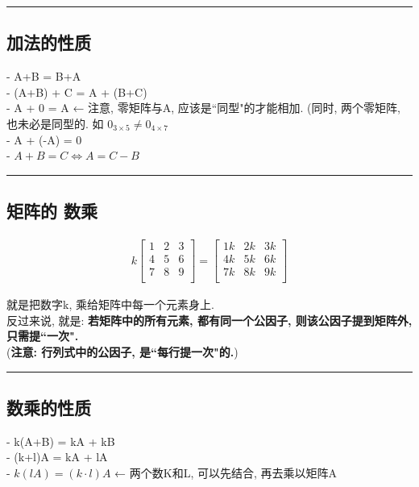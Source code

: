 \documentclass[UTF8]{ctexart}
\begin{document}
	\hrule


\subsection{加法的性质}

- A+B = B+A \\
- (A+B) + C = A + (B+C) \\
- A + 0 = A  ← 注意, 零矩阵与A, 应该是``同型"的才能相加. (同时, 两个零矩阵, 也未必是同型的. 如 $0_{3 \times 5} \ne 0_{4 \times 7} $ \\
- A + (-A) = 0 \\
- $A + B = C \Longleftrightarrow  A = C - B$ \\
	
		\hrule
		
		
\subsection{矩阵的 数乘}	

	\begin{align*}
		k\left[ \begin{matrix}
			1&		2&		3\\
			4&		5&		6\\
			7&		8&		9\\
		\end{matrix} \right] =\left[ \begin{matrix}
			1k&		2k&		3k\\
			4k&		5k&		6k\\
			7k&		8k&		9k\\
		\end{matrix} \right]
	\end{align*}
		
		
就是把数字k, 乘给矩阵中每一个元素身上.\\

反过来说, 就是: \textbf{若矩阵中的所有元素, 都有同一个公因子, 则该公因子提到矩阵外, 只需提``一次".} \\
(\textbf{注意: 行列式中的公因子, 是``每行提一次"的.})\\


\hrule



\subsection{数乘的性质}	

- k(A+B) = kA + kB \\
- (k+l)A = kA + lA \\
- $k(lA) = (k \cdot l)A$  ← 两个数K和L, 可以先结合, 再去乘以矩阵A \\
\end{document}
